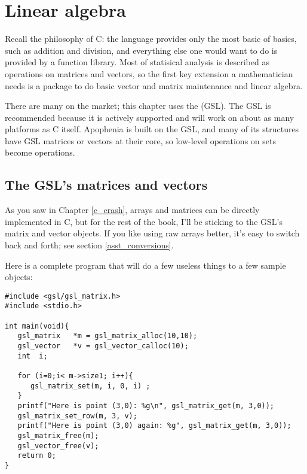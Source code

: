 \startonecol \chapter[Linear Algebra]{Linear algebra} \label{linear_algebra} \endonecol

Recall the philosophy of C: the language provides only the most basic of
basics, such as addition and division, and everything else one would
want to do is provided by a function library. Most of statisical analysis is
described as operations on matrices and vectors, so the first key
extension a mathematician needs is a package to do basic vector and
matrix maintenance and linear algebra.

There are many on the market; this chapter uses the  (GSL). The GSL is recommended because it is actively supported
and will work on about as many platforms as C itself. Apophenia is built
on the GSL, and many of its structures have GSL matrices or vectors at
their core, so low-level operations on  sets become
 operations.

\section{The GSL's matrices and vectors}
As you saw in Chapter \ref{c_crash}, arrays and matrices can be directly implemented in C, but for
the rest of the book, I'll be sticking to the GSL's matrix and vector objects.
If you like using raw arrays better, it's easy to switch back and forth; see
section \ref{asst_conversions}.


Here is a complete program that will do a few useless things to a few sample
objects:\label{gslexample}
\begin{lstlisting}
#include <gsl/gsl_matrix.h>
#include <stdio.h>

int main(void){
   gsl_matrix   *m = gsl_matrix_alloc(10,10);
   gsl_vector   *v = gsl_vector_calloc(10);
   int  i;

   for (i=0;i< m->size1; i++){
      gsl_matrix_set(m, i, 0, i) ;
   }
   printf("Here is point (3,0): %g\n", gsl_matrix_get(m, 3,0));
   gsl_matrix_set_row(m, 3, v);
   printf("Here is point (3,0) again: %g", gsl_matrix_get(m, 3,0));
   gsl_matrix_free(m);
   gsl_vector_free(v);
   return 0;
}
\end{lstlisting}
